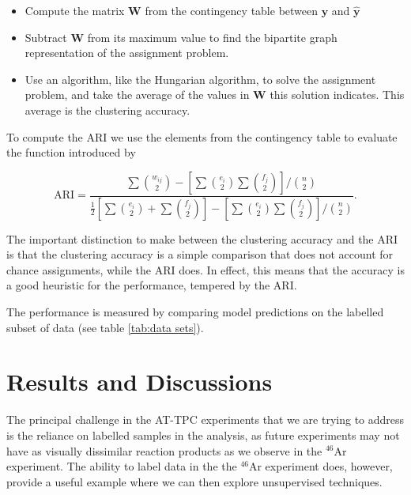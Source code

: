 \documentclass[review,number,sort&compress]{elsarticle}
\begin{document}
\begin{itemize}
    \item Compute the matrix $\mathbf{W}$ from the contingency table between $\mathbf{y}$ and $\mathbf{\hat{y}}$
    \item Subtract $\mathbf{W}$ from its maximum value to find the bipartite graph representation of the assignment problem.
    \item Use an algorithm, like the Hungarian algorithm, to solve the assignment problem, and take the average of the values in $\mathbf{W}$ this solution indicates. This average is the clustering accuracy. 
\end{itemize}

To compute the ARI we use the elements from the contingency table to evaluate the function introduced by \citet{Hubert1985}

\begin{equation}\label{eq:ari}
\text{ARI} = \frac{\sum  \binom{w_{ij}}{2} - \left[\sum  \binom{e_{i}}{2} \sum  \binom{f_{j}}{2}  \right]/\binom{n}{2}}{\frac{1}{2}\left[\sum  \binom{e_{i}}{2} + \sum  \binom{f_{j}}{2}  \right]- \left[\sum  \binom{e_{i}}{2} \sum  \binom{f_{j}}{2}  \right]/\binom{n}{2}}.
\end{equation}

The important distinction to make between the clustering accuracy and the ARI is that the clustering accuracy is a simple comparison that does not account for chance assignments, while the ARI does. In effect, this means that the accuracy is a good heuristic for the performance, tempered by the ARI. 

The performance is measured by comparing model predictions on the labelled subset of data (see table \ref{tab:data sets}).


\section{Results and Discussions}\label{sec:results}

The principal challenge in the AT-TPC experiments that we are trying to address is the reliance on labelled samples in the analysis, as future experiments may not have as visually dissimilar reaction products as we observe in the ${}^{46}$Ar experiment.  The ability to label data in the the ${}^{46}$Ar experiment does, however, provide a useful example where we can then explore unsupervised techniques. 
\end{document}
